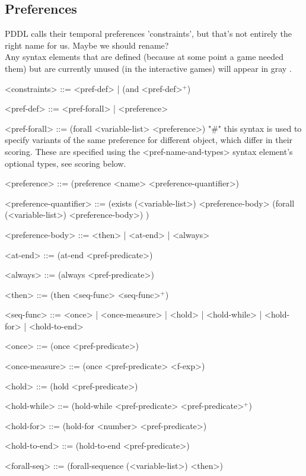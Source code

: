 \documentclass{article}
\begin{document}
\subsection{Preferences}
PDDL calls their temporal preferences 'constraints', but that's not entirely the right name for us. Maybe we should rename? \\

        Any syntax elements that are defined (because at some point a game needed them) but are currently unused (in the interactive games) will appear in { \color{gray} gray }.
        
\begin{grammar}
<constraints> ::= <pref-def> | (and <pref-def>$^+$)
    
<pref-def> ::= <pref-forall> | <preference> 

<pref-forall> ::= (forall <variable-list> <preference>) "#" this syntax is used to specify variants of the same preference for different object, which differ in their scoring. These are specified using the <pref-name-and-types> syntax element's optional types, see scoring below.
    
<preference> ::= (preference <name> <preference-quantifier>)

<preference-quantifier> ::= (exists (<variable-list>) <preference-body> 
\alt  (forall (<variable-list>) <preference-body>)
) 

<preference-body> ::=  <then> | <at-end> | <always> 

<at-end> ::= (at-end <pref-predicate>)

{ \color{teal} <always> ::= (always <pref-predicate>) }

<then> ::= (then <seq-func> <seq-func>$^+$) 

<seq-func> ::= <once> | <once-measure> | <hold> | <hold-while> | <hold-for> | <hold-to-end>

<once> ::= (once <pref-predicate>)

{ \color{gray} <once-measure> ::= (once <pref-predicate> <f-exp>) }

<hold> ::= (hold <pref-predicate>)

<hold-while> ::= (hold-while <pref-predicate> <pref-predicate>$^+$)

{ \color{gray} <hold-for> ::= (hold-for <number> <pref-predicate>) }

{ \color{gray} <hold-to-end> ::= (hold-to-end <pref-predicate>) }

{ \color{gray} <forall-seq> ::= (forall-sequence (<variable-list>) <then>) }


\end{grammar}
\end{document}
